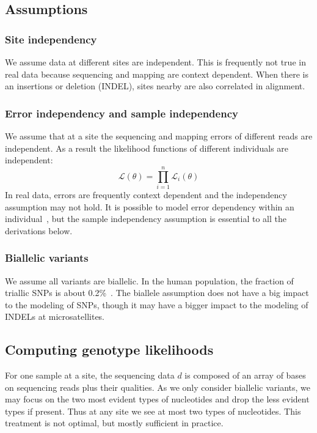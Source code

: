 \documentclass{bioinfo}
\begin{document}
\begin{methods}
\subsection{Assumptions}

\subsubsection{Site independency} We assume data at different sites are independent.
This is frequently not true in real data because sequencing and mapping are
context dependent. When there is an insertions or deletion (INDEL), sites
nearby are also correlated in alignment.

\subsubsection{Error independency and sample independency}
We assume that at a site the sequencing and mapping errors of different reads
are independent. As a result the likelihood functions of different individuals
are independent:
\begin{equation}
\mathcal{L}(\theta)=\prod_{i=1}^n\mathcal{L}_i(\theta)
\end{equation}
In real data, errors are frequently context dependent and the independency
assumption may not hold. It is possible to model error dependency within an
individual~\citep{Li:2008zr}, but the sample independency assumption is
essential to all the derivations below.

\subsubsection{Biallelic variants}
We assume all variants are biallelic. In the human population, the fraction of
triallic SNPs is about 0.2\%~\citep{Hodgkinson:2010uq}. The biallele assumption
does not have a big impact to the modeling of SNPs, though it may have a bigger
impact to the modeling of INDELs at microsatellites.

\subsection{Computing genotype likelihoods}

For one sample at a site, the sequencing data $d$ is composed of an array of
bases on sequencing reads plus their qualities. As we only consider biallelic
variants, we may focus on the two most evident types of nucleotides and drop
the less evident types if present. Thus at any site we see at most two types of
nucleotides. This treatment is not optimal, but mostly sufficient in practice.


\end{methods}
\end{document}

